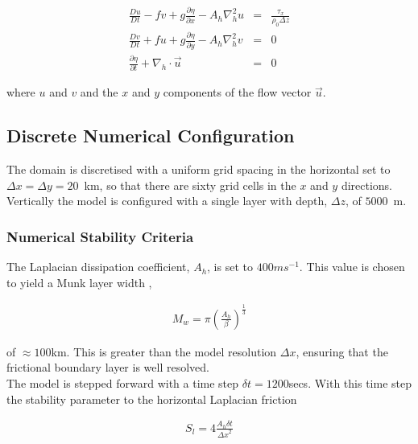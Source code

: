 \begin{eqnarray}
\label{EQ:eg-baro-model_equations}
\frac{Du}{Dt} - fv +
              g\frac{\partial \eta}{\partial x} -
              A_{h}\nabla_{h}^2u
& = &
\frac{\tau_{x}}{\rho_{0}\Delta z}
\\
\frac{Dv}{Dt} + fu + g\frac{\partial \eta}{\partial y} -
              A_{h}\nabla_{h}^2v
& = &
0
\\
\frac{\partial \eta}{\partial t} + \nabla_{h}\cdot \vec{u}
&=&
0
\end{eqnarray}

\noindent where $u$ and $v$ and the $x$ and $y$ components of the
flow vector $\vec{u}$.
\\


\subsection{Discrete Numerical Configuration}
\label{www:tutorials}

 The domain is discretised with 
a uniform grid spacing in the horizontal set to
 $\Delta x=\Delta y=20$~km, so 
that there are sixty grid cells in the $x$ and $y$ directions. Vertically the 
model is configured with a single layer with depth, $\Delta z$, of $5000$~m. 

\subsubsection{Numerical Stability Criteria}
\label{www:tutorials}

The Laplacian dissipation coefficient, $A_{h}$, is set to $400 m s^{-1}$.
This value is chosen to yield a Munk layer width \cite{adcroft:95},

\begin{eqnarray}
\label{EQ:eg-baro-munk_layer}
M_{w} = \pi ( \frac { A_{h} }{ \beta } )^{\frac{1}{3}}
\end{eqnarray}

\noindent  of $\approx 100$km. This is greater than the model
resolution $\Delta x$, ensuring that the frictional boundary
layer is well resolved.
\\

\noindent The model is stepped forward with a 
time step $\delta t=1200$secs. With this time step the stability 
parameter to the horizontal Laplacian friction \cite{adcroft:95}



\begin{eqnarray}
\label{EQ:eg-baro-laplacian_stability}
S_{l} = 4 \frac{A_{h} \delta t}{{\Delta x}^2}
\end{eqnarray}

